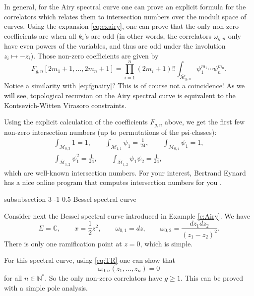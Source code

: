 \documentclass[reqno,oneside,11pt]{amsart}
\makeatletter
\theoremstyle{plain}
\theoremstyle{definition}
\theoremstyle{remark}
\numberwithin{equation}{section}
\renewcommand{\subsubsection}{\@startsection
{subsubsection}%
{3}%
{\z@}%
{-1\baselineskip}%
{0.5\baselineskip}%
{\normalfont \it \normalsize}} %
\makeatother
\begin{document}
In general, for the Airy spectral curve one can prove an explicit formula for the correlators which relates them to intersection numbers over the moduli space of curves. Using the expansion \eqref{eq:exairy}, one can prove that the only non-zero coefficients are when all $k_i$'s are odd (in other words, the correlators $\omega_{g,n}$ only have even powers of the variables, and thus are odd under the involution $z_i \mapsto - z_i$). Those non-zero coefficients are given by
\begin{equation}
F_{g,n}[2m_1+1, \ldots, 2m_n+1] = \prod_{i=1}^n (2m_i+1)!! \int_{\overline{\mathcal{M}}_{g,n}} \psi_1^{m_1} \cdots \psi_n^{m_n}.
\end{equation}
Notice a similarity with \eqref{eq:fgnairy}? This is of course not a coincidence! As we will see, topological recursion on the Airy spectral curve is equivalent to the Kontsevich-Witten Virasoro constraints.

Using the explicit calculation of the coefficients $F_{g,n}$  above, we get the first few non-zero intersection numbers (up to permutations of the psi-classes):
\begin{gather}
\int_{\overline{\mathcal{M}}_{0,3}}1 = 1, \qquad \int_{\overline{\mathcal{M}}_{1,1}} \psi_1 = \frac{1}{24}, \qquad \int_{\overline{\mathcal{M}}_{0,4}} \psi_1 = 1, \\
\int_{\overline{\mathcal{M}}_{1,2}} \psi_1^{2} = \frac{1}{24}, \qquad \int_{\overline{\mathcal{M}}_{1,2}} \psi_1 \psi_2 = \frac{1}{24},
\end{gather}
which are well-known intersection numbers. For your interest, Bertrand Eynard has a nice online program that computes intersection numbers for you \cite{EOjava}.

\subsubsection{Bessel spectral curve}

Consider next the Bessel spectral curve introduced in Example \ref{e:Airy}. We have
\begin{equation}
\Sigma = \mathbb{C}, \qquad x = \frac{1}{2}z^2, \qquad \omega_{0,1} = dz, \qquad \omega_{0,2} = \frac{dz_1 dz_2}{(z_1-z_2)^2}.
\end{equation}
There is only one ramification point at $z=0$, which is simple.

For this spectral curve, using \eqref{eq:TR} one can show that
\begin{equation}
\omega_{0,n}(z_1, \ldots, z_n) = 0
\end{equation}
for all $n \in \mathbb{N}^*$. So the only non-zero correlators have $g \geq 1$. This can be proved with a simple pole analysis.
\end{document}
